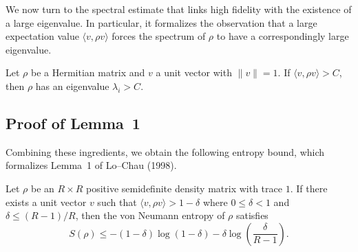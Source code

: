 \noindent We now turn to the spectral estimate that links high fidelity with the existence of a large eigenvalue.
In particular, it formalizes the observation that a large expectation value $\langle v, \rho v \rangle$ forces the spectrum of $\rho$ to have a correspondingly large eigenvalue.

\begin{proposition}
\label{lem:eigenvalue_bound}
\leanok
Let $\rho$ be a Hermitian matrix and $v$ a unit vector with $\|v\| = 1$. 
If $\langle v, \rho v \rangle > C$, then $\rho$ has an eigenvalue $\lambda_i > C$.
\end{proposition}

\bigskip
\bigskip

\subsection*{Proof of Lemma~1}

\noindent Combining these ingredients, we obtain the following entropy bound, which formalizes Lemma~1 of Lo--Chau (1998).

\begin{lemma}
\label{thm:main}
\leanok
{}
Let $\rho$ be an $R \times R$ positive semidefinite density matrix with trace $1$.
If there exists a unit vector $v$ such that $\langle v, \rho v \rangle > 1 - \delta$ where $0 \leq \delta < 1$ and $\delta \leq (R-1)/R$, 
then the von Neumann entropy of $\rho$ satisfies
$$S(\rho) \leq -(1-\delta)\log(1-\delta) - \delta \log\left(\frac{\delta}{R-1}\right).$$
\end{lemma}

